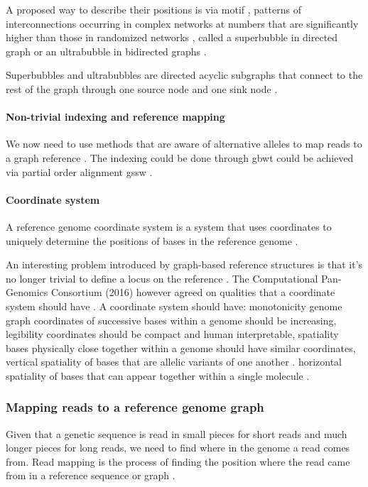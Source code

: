 \documentclass[10pt, a4paper]{article}
\begin{document}
A proposed way to describe their positions is via motif
\cite{patenGenomeGraphsEvolution2017}, patterns of interconnections occurring
in complex networks at numbers that are significantly higher than those in
randomized networks \cite{miloNetworkMotifsSimple2002}, called a superbubble in directed graph
or an ultrabubble in bidirected graphs \cite{patenSuperbubblesUltrabubblesCacti2017}.

Superbubbles and ultrabubbles are directed acyclic subgraphs that connect to the
rest of the graph through one source node and one sink node
\cite{patenSuperbubblesUltrabubblesCacti2017}.
\paragraph{Non-trivial indexing and reference mapping}
\label{sec:org05b0dcc}
We now need to use methods that are aware of alternative alleles to map reads to
a graph reference \cite{patenGenomeGraphsEvolution2017}. 
The indexing could be done through gbwt \cite{sirenHaplotypeawareGraphIndexes2018}
could be achieved via partial order alignment gssw \cite{zhaoSSWLibrarySIMD2013}.
\paragraph{Coordinate system}
\label{sec:org47a3308}
A reference genome coordinate system is a system that uses coordinates to
uniquely determine the positions of bases in the reference genome 
\cite{randCoordinatesIntervalsGraphbased2017}.

An interesting problem introduced by graph-based reference structures is that
it’s no longer trivial to define a locus on the reference
\cite{patenGenomeGraphsEvolution2017}. The Computational Pan-Genomics
Consortium (2016) however agreed on qualities that a coordinate system should 
have \cite{patenGenomeGraphsEvolution2017,randCoordinatesIntervalsGraphbased2017}.
A coordinate system should have: monotonicity genome graph coordinates of
successive bases within a genome should be increasing, legibility coordinates 
should be compact and human interpretable, spatiality bases physically close
together within a genome should have similar coordinates, vertical spatiality
of bases that are allelic variants of one another
\cite{randCoordinatesIntervalsGraphbased2017}. 
horizontal spatiality of bases that can appear together within a single molecule
\cite{randCoordinatesIntervalsGraphbased2017}.
\subsubsection{Mapping reads to a reference genome graph}
\label{sec:orgb1b82c5}
Given that a genetic sequence is read in small pieces for short reads and much
longer pieces for long reads, we need to find where in the genome a read comes
from. Read mapping is the process of finding the position where the read came
from in a reference sequence or graph \cite{novakGenomeGraphs2017}.
\end{document}
